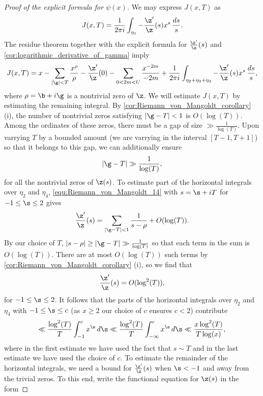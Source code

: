 \begin{proof}[Proof of the explicit formula for $\psi(x)$]
        We may express $J(x,T)$ as
        \[
          J(x,T) = \frac{1}{2\pi i}\int_{\eta_{1}}-\frac{\z'}{\z}(s)x^{s}\,\frac{ds}{s}.
        \]
        The residue theorem together with the explicit formula for $\frac{\z'}{\z}(s)$ and \cref{cor:logarithmic_derivative_of_gamma} imply
        \begin{equation}\label{equ:explicit_formula_zeta_proof_7}
          J(x,T) = x-\sum_{|\g| < T}\frac{x^{\rho}}{\rho}-\frac{\z'}{\z}(0)-\sum_{0 < 2m < U}\frac{x^{-2m}}{-2m}+\frac{1}{2\pi i}\int_{\eta_{2}+\eta_{3}+\eta_{4}}-\frac{\z'}{\z}(s)x^{s}\,\frac{ds}{s},
        \end{equation}
        where $\rho = \b+i\g$ is a nontrivial zero of $\z$. We will estimate $J(x,T)$ by estimating the remaining integral. By \cref{cor:Riemann_von_Mangoldt_corollary} (i), the number of nontrivial zeros satisfying $|\g-T| < 1$ is $O(\log(T))$. Among the ordinates of these zeros, there must be a gap of size $\gg \frac{1}{\log(T)}$. Upon varrying $T$ by a bounded amount (we are varrying in the interval $[T-1,T+1]$) so that it belongs to this gap, we can additionally ensure
        \[
          |\g-T| \gg \frac{1}{\log(T)},
        \]
        for all the nontrivial zeros of $\z(s)$. To estimate part of the horizontal integrals over $\eta_{2}$ and $\eta_{4}$, \cref{equ:Riemann_von_Mangoldt_14} with $s = \s+iT$ for $-1 \le \s \le 2$ gives
        \[
          \frac{\z'}{\z}(s) = \sum_{|\g-T| < 1}\frac{1}{s-\rho}+O(\log(T)).
        \]
        By our choice of $T$, $|s-\rho| \ge |\g-T| \gg \frac{1}{\log(T)}$ so that each term in the sum is $O(\log(T))$. There are at most $O(\log(T))$ such terms by \cref{cor:Riemann_von_Mangoldt_corollary} (i), so we find that
        \[
          \frac{\z'}{\z}(s) = O(\log^{2}(T)),
        \]
        for $-1 \le \s \le 2$. It follows that the parts of the horizontal integrals over $\eta_{2}$ and $\eta_{4}$ with  $-1 \le \s \le c$ (as $x \ge 2$ our choice of $c$ ensures $c < 2$) contribute
        \begin{equation}\label{equ:explicit_formula_zeta_proof_8}
          \ll \frac{\log^{2}(T)}{T}\int_{-1}^{c}x^{\s}\,d\s \ll \frac{\log^{2}(T)}{T}\int_{-\infty}^{c}x^{\s}\,d\s \ll \frac{x\log^{2}(T)}{T\log(x)},
        \end{equation}
        where in the first estimate we have used the fact that $s \sim T$ and in the last estimate we have used the choice of $c$. To estimate the remainder of the horizontal integrals, we need a bound for $\frac{\z'}{\z}(s)$ when $\s < -1$ and away from the trivial zeros. To this end, write the functional equation for $\z(s)$ in the form

\end{proof}
